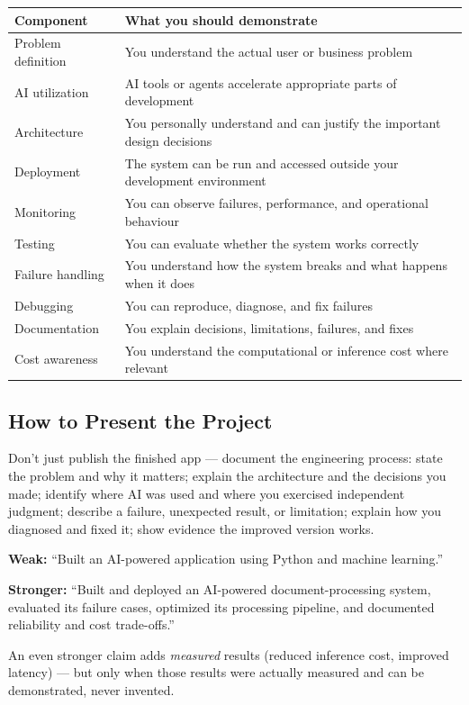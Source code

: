 \begin{longtable}{p{} p{}}
\toprule
\textbf{Component} & \textbf{What you should demonstrate} \\
\midrule
\endhead
Problem definition & You understand the actual user or business problem \\
AI utilization & AI tools or agents accelerate appropriate parts of development \\
Architecture & You personally understand and can justify the important design decisions \\
Deployment & The system can be run and accessed outside your development environment \\
Monitoring & You can observe failures, performance, and operational behaviour \\
Testing & You can evaluate whether the system works correctly \\
Failure handling & You understand how the system breaks and what happens when it does \\
Debugging & You can reproduce, diagnose, and fix failures \\
Documentation & You explain decisions, limitations, failures, and fixes \\
Cost awareness & You understand the computational or inference cost where relevant \\
\bottomrule
\end{longtable}

\subsection{How to Present the Project}

Don't just publish the finished app --- document the engineering process: state the problem and why it matters;
explain the architecture and the decisions you made; identify where AI was used and where you exercised
independent judgment; describe a failure, unexpected result, or limitation; explain how you diagnosed and fixed
it; show evidence the improved version works.

\begin{example}
\bad \textbf{Weak:} ``Built an AI-powered application using Python and machine learning.''

\good \textbf{Stronger:} ``Built and deployed an AI-powered document-processing system, evaluated its failure
cases, optimized its processing pipeline, and documented reliability and cost trade-offs.''

An even stronger claim adds \emph{measured} results (reduced inference cost, improved latency) --- but only when
those results were actually measured and can be demonstrated, never invented.
\end{example}

